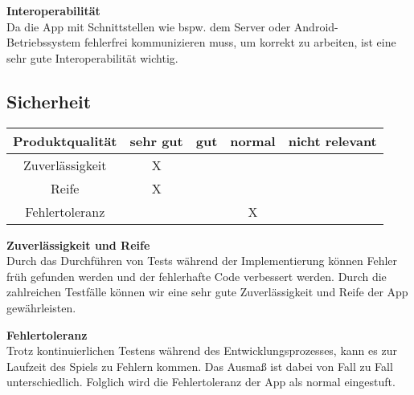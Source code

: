 \documentclass[parskip=full]{scrartcl}
\begin{document}
\textbf{Interoperabilität}\\
Da die App mit Schnittstellen wie bspw. dem Server oder Android-Betriebssystem fehlerfrei kommunizieren muss, um korrekt zu arbeiten, ist eine sehr gute Interoperabilität wichtig.

\subsection{Sicherheit}
\begin{tabular}{| c | c | c | c | c |}
    \hline
    \textbf{Produktqualität} & \textbf{sehr gut} & \textbf{gut} & \textbf{normal} & \textbf{nicht relevant} \\ \hline
    Zuverlässigkeit          & X                 &              &                 &                         \\ \hline
    Reife                    & X                 &              &                 &                         \\ \hline
    Fehlertoleranz           &                   &              & X               &                         \\ \hline
\end{tabular}

\textbf{Zuverlässigkeit und Reife}\\
Durch das Durchführen von Tests während der Implementierung können Fehler früh gefunden werden und der fehlerhafte Code verbessert werden.
Durch die zahlreichen Testfälle können wir eine sehr gute Zuverlässigkeit und Reife der App gewährleisten.

\textbf{Fehlertoleranz}\\
Trotz kontinuierlichen Testens während des Entwicklungsprozesses, kann es zur Laufzeit des Spiels zu Fehlern kommen.
Das Ausmaß ist dabei von Fall zu Fall unterschiedlich.
Folglich wird die Fehlertoleranz der App als normal eingestuft.
\end{document}
